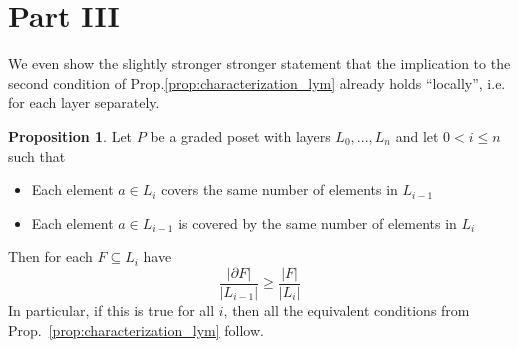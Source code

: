 \documentclass{scrartcl}
\theoremstyle{definition}
\newtheorem{proposition}[definition]{Proposition}
\begin{document}
\section{Part III}
We even show the slightly stronger stronger statement that the implication to the second condition of Prop.\ref{prop:characterization_lym} already holds ``locally'', i.e. for each layer separately.
\begin{proposition}
    \label{prop:biregular_implies_lym}
    Let $P$ be a graded poset with layers $L_0, ..., L_n$ and let $0 < i \leq n$ such that
    \begin{itemize}
        \item Each element $a \in L_i$ covers the same number of elements in $L_{i - 1}$
        \item Each element $a \in L_{i - 1}$ is covered by the same number of elements in $L_i$
    \end{itemize}
    Then for each $F \subseteq L_i$ have
    \begin{equation*}
        \frac {|\partial F|} {|L_{i - 1}|} \geq \frac {|F|} {|L_i|}
    \end{equation*}
    In particular, if this is true for all $i$, then all the equivalent conditions from Prop.~\ref{prop:characterization_lym} follow.
\end{proposition}
\end{document}
